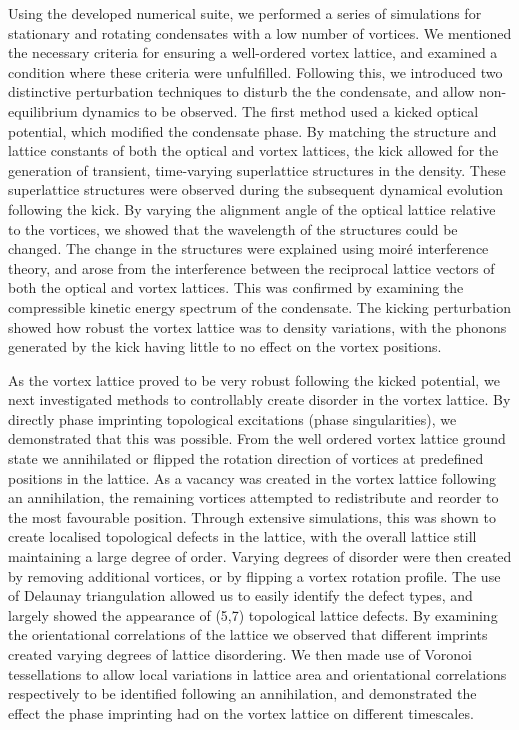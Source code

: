 Using the developed numerical suite, we performed a series of simulations for stationary and rotating condensates with a low number of vortices. We mentioned the necessary criteria for ensuring a well-ordered vortex lattice, and examined a condition where these criteria were unfulfilled. Following this, we introduced two distinctive perturbation techniques to disturb the the condensate, and allow non-equilibrium dynamics to be observed. The first method used a kicked optical potential, which modified the condensate phase. By matching the structure and lattice constants of both the optical and vortex lattices, the kick allowed for the generation of transient, time-varying superlattice structures in the density. These superlattice structures were observed during the subsequent dynamical evolution following the kick. By varying the alignment angle of the optical lattice relative to the vortices, we showed that the wavelength of the structures could be changed. The change in the structures were explained using moir\'e interference theory, and arose from the interference between the reciprocal lattice vectors of both the optical and vortex lattices. This was confirmed by examining the compressible kinetic energy spectrum of the condensate. The kicking perturbation showed how robust the vortex lattice was to density variations, with the phonons generated by the kick having little to no effect on the vortex positions.

As the vortex lattice proved to be very robust following the kicked potential, we next investigated methods to controllably create disorder in the vortex lattice. By directly phase imprinting topological excitations (phase singularities), we demonstrated that this was possible. From the well ordered vortex lattice ground state we annihilated or flipped the rotation direction of vortices at predefined positions in the lattice. As a vacancy was created in the vortex lattice following an annihilation, the remaining vortices attempted to redistribute and reorder to the most favourable position. Through extensive simulations, this was shown to create localised topological defects in the lattice, with the overall lattice still maintaining a large degree of order. Varying degrees of disorder were then created by removing additional vortices, or by flipping a vortex rotation profile. The use of Delaunay triangulation allowed us to easily identify the defect types, and largely showed the appearance of (5,7) topological lattice defects. By examining the orientational correlations of the lattice we observed that different imprints created varying degrees of lattice disordering. We then made use of Voronoi tessellations to allow local variations in lattice area and orientational correlations respectively to be identified following an annihilation, and demonstrated the effect the phase imprinting had on the vortex lattice on different timescales.

